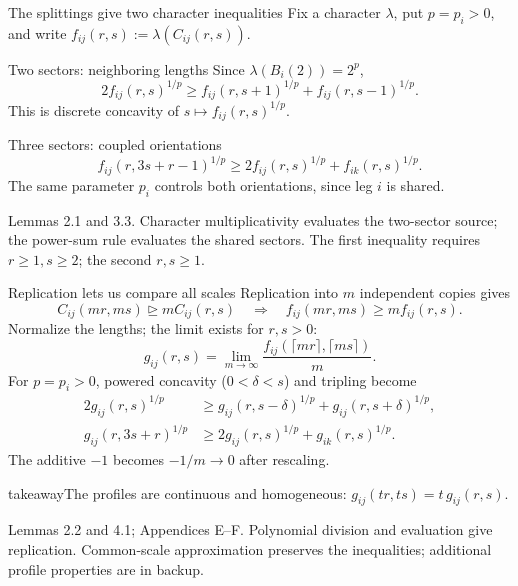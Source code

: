 \documentclass[aspectratio=169,11pt]{beamer}
\newcommand{\degen}{\unrhd}
\newcommand{\source}[1]{\vfill\par{\fontsize{7.5}{9}\selectfont\color{muted}#1\par}}
\newcommand{\takeaway}[1]{\begin{beamercolorbox}[sep=0.65em,wd=\linewidth]{takeaway}#1\end{beamercolorbox}}
\begin{document}
\begin{frame}{The splittings give two character inequalities}
  Fix a character $\lambda$, put $p=p_i>0$, and write
  $f_{ij}(r,s):=\lambda(C_{ij}(r,s))$.
  \begin{block}{Two sectors: neighboring lengths}
    Since $\lambda(B_i(2))=2^p$,
    \[
      2f_{ij}(r,s)^{1/p}
        \ge f_{ij}(r,s+1)^{1/p}+f_{ij}(r,s-1)^{1/p}.
    \]
    This is discrete concavity of $s\mapsto f_{ij}(r,s)^{1/p}$.
  \end{block}
  \begin{block}{Three sectors: coupled orientations}
    \[
      f_{ij}(r,3s+r-1)^{1/p}
        \ge2f_{ij}(r,s)^{1/p}+f_{ik}(r,s)^{1/p}.
    \]
    The same parameter $p_i$ controls both orientations, since leg $i$ is shared.
  \end{block}
  \source{Lemmas 2.1 and 3.3. Character multiplicativity evaluates the
  two-sector source; the power-sum rule evaluates the shared sectors.
  The first inequality requires $r\ge1,s\ge2$; the second $r,s\ge1$.}
\end{frame}

\begin{frame}{Replication lets us compare all scales}
  Replication into $m$ independent copies gives
  \[
    C_{ij}(mr,ms)\degen mC_{ij}(r,s)
    \quad\Longrightarrow\quad
    f_{ij}(mr,ms)\ge m f_{ij}(r,s).
  \]
  Normalize the lengths; the limit exists for $r,s>0$:
  \[
    g_{ij}(r,s)=\lim_{m\to\infty}
      \frac{f_{ij}(\lceil mr\rceil,\lceil ms\rceil)}{m}.
  \]
  For $p=p_i>0$, powered concavity ($0<\delta<s$) and tripling become
  \[
  \begin{aligned}
    2g_{ij}(r,s)^{1/p}
      &\ge g_{ij}(r,s-\delta)^{1/p}+g_{ij}(r,s+\delta)^{1/p},\\
    g_{ij}(r,3s+r)^{1/p}
      &\ge2g_{ij}(r,s)^{1/p}+g_{ik}(r,s)^{1/p}.
  \end{aligned}
  \]
  The additive $-1$ becomes $-1/m\to0$ after rescaling.
  \par\smallskip
  \takeaway{The profiles are continuous and homogeneous:
    $\displaystyle g_{ij}(tr,ts)=t\,g_{ij}(r,s)$.}
  \source{Lemmas 2.2 and 4.1; Appendices E--F. Polynomial division and evaluation
  give replication. Common-scale approximation preserves the inequalities;
  additional profile properties are in backup.}
\end{frame}
\end{document}

